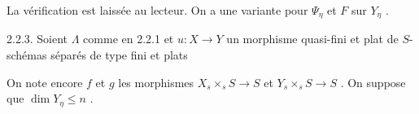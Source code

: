 \begin{center}
\end{center}


La vérification est laissée au lecteur. On a une variante pour $\Psi_\eta$ et $F$ sur $Y_\eta$ .

2.2.3. Soient $\Lambda$ comme en 2.2.1 et $u : X \to Y$ un morphisme quasi-fini et plat de $S$-schémas séparés de type fini et plats

\begin{center}
\end{center}
On note encore $f$ et $g$ les morphismes $X_s \times_s S \to S$ et $Y_s \times_s S \to S$ . On suppose que $\dim Y_\eta \leq n$ .

